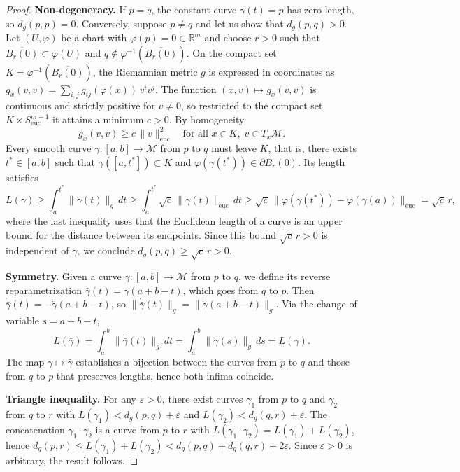 \begin{proof}
\textbf{Non-degeneracy.} If $p = q$, the constant curve $\gamma(t) = p$ has zero length, so $d_g(p,p) = 0$. Conversely, suppose $p \neq q$ and let us show that $d_g(p,q) > 0$. Let $(U, \varphi)$ be a chart with $\varphi(p) = 0 \in \mathbb{R}^m$ and choose $r > 0$ such that $\overline{B_r(0)} \subset \varphi(U)$ and $q \notin \varphi^{-1}(\overline{B_r(0)})$. On the compact set $K = \varphi^{-1}(\overline{B_r(0)})$, the Riemannian metric $g$ is expressed in coordinates as $g_x(v,v) = \sum_{i,j} g_{ij}(\varphi(x))\, v^i v^j$. The function $(x,v) \mapsto g_x(v,v)$ is continuous and strictly positive for $v \neq 0$, so restricted to the compact set $K \times S^{m-1}_{\text{euc}}$ it attains a minimum $c > 0$. By homogeneity,
\[
g_x(v,v) \geq c\,\|v\|_{\text{euc}}^2 \quad \text{for all } x \in K,\; v \in T_x\mathcal{M}.
\]
Every smooth curve $\gamma: [a,b] \to \mathcal{M}$ from $p$ to $q$ must leave $K$, that is, there exists $t^* \in [a,b]$ such that $\gamma([a,t^*]) \subset K$ and $\varphi(\gamma(t^*)) \in \partial B_r(0)$. Its length satisfies
\[
L(\gamma) \geq \int_a^{t^*} \|\dot\gamma(t)\|_g\, dt \geq \int_a^{t^*} \sqrt{c}\,\|\dot\gamma(t)\|_{\text{euc}}\, dt \geq \sqrt{c}\,\|\varphi(\gamma(t^*)) - \varphi(\gamma(a))\|_{\text{euc}} = \sqrt{c}\, r,
\]
where the last inequality uses that the Euclidean length of a curve is an upper bound for the distance between its endpoints. Since this bound $\sqrt{c}\, r > 0$ is independent of $\gamma$, we conclude $d_g(p,q) \geq \sqrt{c}\, r > 0$.

\textbf{Symmetry.} Given a curve $\gamma: [a,b] \to \mathcal{M}$ from $p$ to $q$, we define its reverse reparametrization $\bar\gamma(t) = \gamma(a+b-t)$, which goes from $q$ to $p$. Then $\dot{\bar\gamma}(t) = -\dot\gamma(a+b-t)$, so $\|\dot{\bar\gamma}(t)\|_g = \|\dot\gamma(a+b-t)\|_g$. Via the change of variable $s = a+b-t$,
\[
L(\bar\gamma) = \int_a^b \|\dot{\bar\gamma}(t)\|_g\, dt = \int_a^b \|\dot\gamma(s)\|_g\, ds = L(\gamma).
\]
The map $\gamma \mapsto \bar\gamma$ establishes a bijection between the curves from $p$ to $q$ and those from $q$ to $p$ that preserves lengths, hence both infima coincide.

\textbf{Triangle inequality.} For any $\varepsilon > 0$, there exist curves $\gamma_1$ from $p$ to $q$ and $\gamma_2$ from $q$ to $r$ with $L(\gamma_1) < d_g(p,q) + \varepsilon$ and $L(\gamma_2) < d_g(q,r) + \varepsilon$. The concatenation $\gamma_1 \cdot \gamma_2$ is a curve from $p$ to $r$ with $L(\gamma_1 \cdot \gamma_2) = L(\gamma_1) + L(\gamma_2)$, hence $d_g(p,r) \leq L(\gamma_1) + L(\gamma_2) < d_g(p,q) + d_g(q,r) + 2\varepsilon$. Since $\varepsilon > 0$ is arbitrary, the result follows.
\end{proof}

